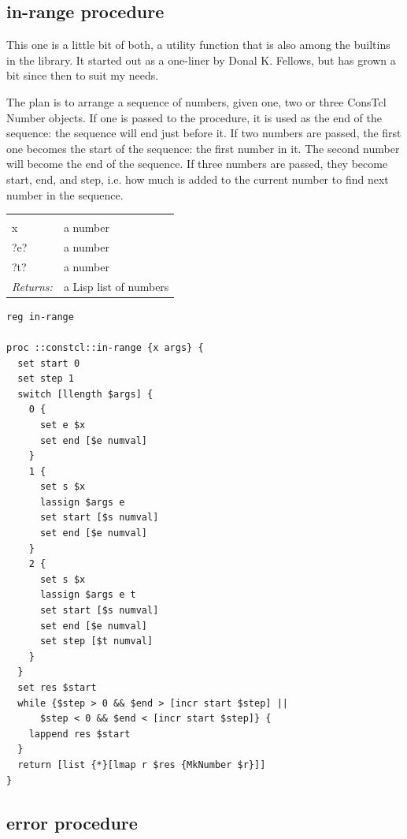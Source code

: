 \documentclass[twoside,9pt]{report}
\begin{document}
\subsection{in-range procedure}
\label{in-range-procedure}


This one is a little bit of both, a utility function that is also among the builtins in the library. It started out as a one-liner by Donal K. Fellows, but has grown a bit since then to suit my needs.


The plan is to arrange a sequence of numbers, given one, two or three ConsTcl Number objects. If one is passed to the procedure, it is used as the end of the sequence: the sequence will end just before it. If two numbers are passed, the first one becomes the start of the sequence: the first number in it. The second number will become the end of the sequence. If three numbers are passed, they become start, end, and step, i.e. how much is added to the current number to find next number in the sequence.

\noindent\begin{tabular}{ |p{1.5cm} p{8cm}| }
\hline
\rowcolor[HTML]{CCCCCC} \multicolumn{2}{|l|}{\bf in-range (public)} \\
x & a number \\
?e? & a number \\
?t? & a number \\
\textit{Returns:} & a Lisp list of numbers \\
\hline
\end{tabular}
\begin{lstlisting}
reg in-range
 
proc ::constcl::in-range {x args} {
  set start 0
  set step 1
  switch [llength $args] {
    0 {
      set e $x
      set end [$e numval]
    }
    1 {
      set s $x
      lassign $args e
      set start [$s numval]
      set end [$e numval]
    }
    2 {
      set s $x
      lassign $args e t
      set start [$s numval]
      set end [$e numval]
      set step [$t numval]
    }
  }
  set res $start
  while {$step > 0 && $end > [incr start $step] ||
      $step < 0 && $end < [incr start $step]} {
    lappend res $start
  }
  return [list {*}[lmap r $res {MkNumber $r}]]
}
\end{lstlisting}
\subsection{error procedure}
\label{error-procedure}
\end{document}
